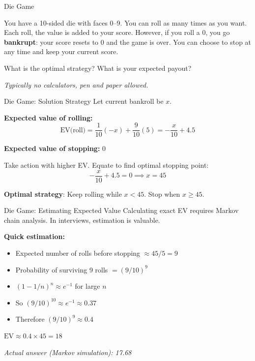 \begin{frame}{Die Game}
  \begin{sqt:tip}
    You have a 10-sided die with faces 0--9. You can roll as many times as you want.
    Each roll, the value is added to your score. However, if you roll a 0, you go
    \textbf{bankrupt}: your score resets to 0 and the game is over.
    You can choose to stop at any time and keep your current score.
  \end{sqt:tip}

  \vspace{0.5cm}
  \textcolor{sqt-question}{What is the optimal strategy? What is your expected payout?}

  \vspace{0.3cm}
  \textit{Typically no calculators, pen and paper allowed.}
\end{frame}

\begin{frame}{Die Game: Solution Strategy}
  Let current bankroll be $x$.

  \vspace{0.3cm}
  \textbf{Expected value of rolling:}
  \[
    \text{EV(roll)} = \frac{1}{10}(-x) + \frac{9}{10}(5) = -\frac{x}{10} + 4.5
  \]

  \textbf{Expected value of stopping:} $0$

  \vspace{0.3cm}
  Take action with higher EV. Equate to find optimal stopping point:
  \[
    -\frac{x}{10} + 4.5 = 0 \implies x = 45
  \]

  \begin{sqt:result}
    \textbf{Optimal strategy}: Keep rolling while $x < 45$. Stop when $x \geq 45$.
  \end{sqt:result}
\end{frame}

\begin{frame}{Die Game: Estimating Expected Value}
  Calculating exact EV requires Markov chain analysis. In interviews,
  estimation is valuable.

  \vspace{0.3cm}
  \textbf{Quick estimation:}
  \begin{itemize}
    \item Expected number of rolls before stopping $\approx 45/5 = 9$
    \item Probability of surviving 9 rolls $= (9/10)^9$
    \item $(1 - 1/n)^n \approx e^{-1}$ for large $n$
    \item So $(9/10)^{10} \approx e^{-1} \approx 0.37$
    \item Therefore $(9/10)^9 \approx 0.4$
  \end{itemize}

  \vspace{0.3cm}
  \begin{sqt:result}
    $\text{EV} \approx 0.4 \times 45 = 18$

    \vspace{0.2cm}
    \textit{Actual answer (Markov simulation): 17.68}
  \end{sqt:result}
\end{frame}


